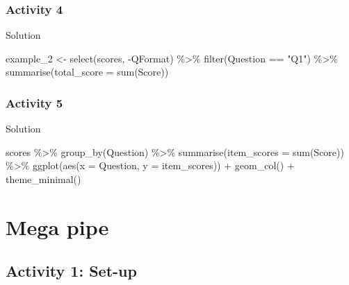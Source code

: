 \documentclass[
  oneside]{book}
\newenvironment{Shaded}{\begin{snugshade}}{\end{snugshade}}
\newcommand{\AttributeTok}[1]{\textcolor[rgb]{0.77,0.63,0.00}{#1}}
\newcommand{\FunctionTok}[1]{\textcolor[rgb]{0.00,0.00,0.00}{#1}}
\newcommand{\NormalTok}[1]{#1}
\newcommand{\OtherTok}[1]{\textcolor[rgb]{0.56,0.35,0.01}{#1}}
\newcommand{\SpecialCharTok}[1]{\textcolor[rgb]{0.00,0.00,0.00}{#1}}
\newcommand{\StringTok}[1]{\textcolor[rgb]{0.31,0.60,0.02}{#1}}
\begin{document}
\hypertarget{activity-4-3}{%
\subsection{Activity 4}\label{activity-4-3}}

Solution

\begin{Shaded}
\begin{Highlighting}[]
\NormalTok{example\_2 }\OtherTok{\textless{}{-}} \FunctionTok{select}\NormalTok{(scores, }\SpecialCharTok{{-}}\NormalTok{QFormat) }\SpecialCharTok{\%\textgreater{}\%}
  \FunctionTok{filter}\NormalTok{(Question }\SpecialCharTok{==} \StringTok{"Q1"}\NormalTok{) }\SpecialCharTok{\%\textgreater{}\%}
  \FunctionTok{summarise}\NormalTok{(}\AttributeTok{total\_score =} \FunctionTok{sum}\NormalTok{(Score))}
\end{Highlighting}
\end{Shaded}

\hypertarget{activity-5-2}{%
\subsection{Activity 5}\label{activity-5-2}}

Solution

\begin{Shaded}
\begin{Highlighting}[]
\NormalTok{scores }\SpecialCharTok{\%\textgreater{}\%}
  \FunctionTok{group\_by}\NormalTok{(Question) }\SpecialCharTok{\%\textgreater{}\%}
  \FunctionTok{summarise}\NormalTok{(}\AttributeTok{item\_scores =} \FunctionTok{sum}\NormalTok{(Score)) }\SpecialCharTok{\%\textgreater{}\%}
  \FunctionTok{ggplot}\NormalTok{(}\FunctionTok{aes}\NormalTok{(}\AttributeTok{x =}\NormalTok{ Question, }\AttributeTok{y =}\NormalTok{ item\_scores)) }\SpecialCharTok{+}
  \FunctionTok{geom\_col}\NormalTok{() }\SpecialCharTok{+}
  \FunctionTok{theme\_minimal}\NormalTok{()}
\end{Highlighting}
\end{Shaded}

\hypertarget{mega-pipe}{%
\chapter{Mega pipe}\label{mega-pipe}}

\hypertarget{activity-1-set-up-4}{%
\section{Activity 1: Set-up}\label{activity-1-set-up-4}}
\end{document}
